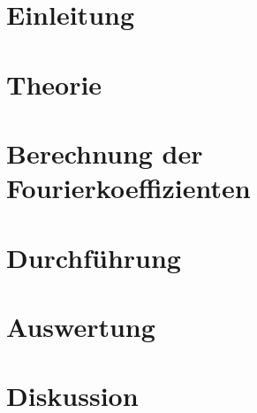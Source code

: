 


	
	\section{Einleitung}\label{sec:Einleitung}
		
	
	\section{Theorie}\label{sec:Theorie}
		
\newpage		
	\section{Berechnung der Fourierkoeffizienten}\label{sec:Aufgaben}
		
\newpage
	\section{Durchführung}\label{sec:Durchführung}
		
	

	\section{Auswertung}\label{sec:Auswertung}
		
		
%		
	
\vspace*{5cm}
	\section{Diskussion}\label{sec:Diskussion}
		
	
	\newpage

	\printbibliography

